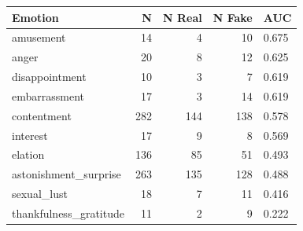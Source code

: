 \begin{tabular}{lrrrl}
\toprule
Emotion & N & N Real & N Fake & AUC \\
\midrule
amusement & 14 & 4 & 10 & 0.675 \\
anger & 20 & 8 & 12 & 0.625 \\
disappointment & 10 & 3 & 7 & 0.619 \\
embarrassment & 17 & 3 & 14 & 0.619 \\
contentment & 282 & 144 & 138 & 0.578 \\
interest & 17 & 9 & 8 & 0.569 \\
elation & 136 & 85 & 51 & 0.493 \\
astonishment\_surprise & 263 & 135 & 128 & 0.488 \\
sexual\_lust & 18 & 7 & 11 & 0.416 \\
thankfulness\_gratitude & 11 & 2 & 9 & 0.222 \\
\bottomrule
\end{tabular}
